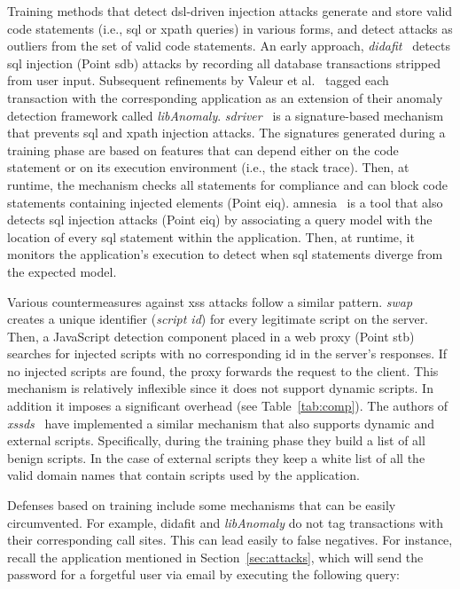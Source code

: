 \documentclass[conference]{IEEEtran}
\begin{document}
Training methods that detect {\sc dsl}-driven injection attacks
generate and store valid code statements (i.e., {\sc sql} or {\sc
  xp}ath queries) in various forms, and detect attacks as outliers
from the set of valid code statements. An early approach, {\it {\sc
    didafit}}~\cite{LLW02} detects {\sc sql} injection (Point
{\sc sdb}) attacks by recording all database transactions
stripped from user input. Subsequent
refinements by Valeur et al.~\cite{VMV05} tagged each transaction with
the corresponding application as an extension of their anomaly
detection framework called {\it libAnomaly}. {\it {\sc
    sd}river}~\cite{MS09,MKS09,MKLS11} is a signature-based mechanism
that prevents {\sc sql} and {\sc xp}ath injection attacks. The
signatures generated during a training phase are based on features
that can depend either on the code statement or on its execution
environment (i.e., the stack trace). Then, at runtime, the mechanism
checks all statements for compliance and can block code statements
containing injected elements (Point {\sc e}i{\sc q}). {\sc
  amnesia}~\cite{HO05,HO06,HO05b} is a tool that also detects {\sc
  sql} injection attacks (Point {\sc e}i{\sc q}) by associating a query model
with the location of every {\sc sql} statement within the application.
Then, at runtime, it monitors the application's execution to detect
when {\sc sql} statements diverge from the expected model.

Various countermeasures against {\sc xss} attacks follow a similar
pattern. {\it {\sc swap}}~\cite{WPLKK09} creates a unique identifier
({\it script {\sc id}}) for every legitimate script on the server.
Then, a JavaScript detection component placed in a web proxy (Point
{\sc s}t{\sc b}) searches for injected scripts with no corresponding {\sc id}
in the server's responses. If no injected scripts are found, the proxy
forwards the request to the client. This mechanism is relatively
inflexible since it does not support dynamic scripts. In addition it
imposes a significant overhead (see Table~\ref{tab:comp}). The authors
of {\it {\sc xssds}}~\cite{JEP08} have implemented a similar mechanism
that also supports dynamic and external scripts. Specifically, during the
training phase they build a list of all benign scripts. In the case of
external scripts they keep a white list of all the valid domain names
that contain scripts used by the application.

Defenses based on training include some mechanisms that can be easily
circumvented. For example, {\sc didafit} and {\it libAnomaly} do not
tag transactions with their corresponding call sites. This can lead
easily to false negatives. For instance, recall the application
mentioned in Section~\ref{sec:attacks}, which will send the password
for a forgetful user via email by executing the following query:
\end{document}
